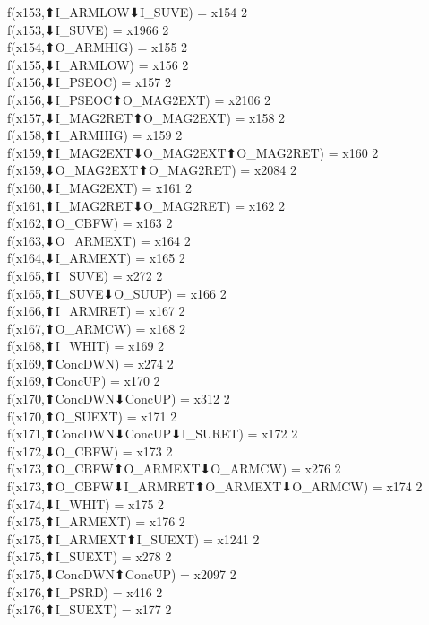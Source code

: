 f(x153,⬆I_ARMLOW⬇I_SUVE) = x154 {2} \\
f(x153,⬇I_SUVE) = x1966 {2} \\
f(x154,⬆O_ARMHIG) = x155 {2} \\
f(x155,⬇I_ARMLOW) = x156 {2} \\
f(x156,⬇I_PSEOC) = x157 {2} \\
f(x156,⬇I_PSEOC⬆O_MAG2EXT) = x2106 {2} \\
f(x157,⬇I_MAG2RET⬆O_MAG2EXT) = x158 {2} \\
f(x158,⬆I_ARMHIG) = x159 {2} \\
f(x159,⬆I_MAG2EXT⬇O_MAG2EXT⬆O_MAG2RET) = x160 {2} \\
f(x159,⬇O_MAG2EXT⬆O_MAG2RET) = x2084 {2} \\
f(x160,⬇I_MAG2EXT) = x161 {2} \\
f(x161,⬆I_MAG2RET⬇O_MAG2RET) = x162 {2} \\
f(x162,⬆O_CBFW) = x163 {2} \\
f(x163,⬇O_ARMEXT) = x164 {2} \\
f(x164,⬇I_ARMEXT) = x165 {2} \\
f(x165,⬆I_SUVE) = x272 {2} \\
f(x165,⬆I_SUVE⬇O_SUUP) = x166 {2} \\
f(x166,⬆I_ARMRET) = x167 {2} \\
f(x167,⬆O_ARMCW) = x168 {2} \\
f(x168,⬆I_WHIT) = x169 {2} \\
f(x169,⬆ConcDWN) = x274 {2} \\
f(x169,⬆ConcUP) = x170 {2} \\
f(x170,⬆ConcDWN⬇ConcUP) = x312 {2} \\
f(x170,⬆O_SUEXT) = x171 {2} \\
f(x171,⬆ConcDWN⬇ConcUP⬇I_SURET) = x172 {2} \\
f(x172,⬇O_CBFW) = x173 {2} \\
f(x173,⬆O_CBFW⬆O_ARMEXT⬇O_ARMCW) = x276 {2} \\
f(x173,⬆O_CBFW⬇I_ARMRET⬆O_ARMEXT⬇O_ARMCW) = x174 {2} \\
f(x174,⬇I_WHIT) = x175 {2} \\
f(x175,⬆I_ARMEXT) = x176 {2} \\
f(x175,⬆I_ARMEXT⬆I_SUEXT) = x1241 {2} \\
f(x175,⬆I_SUEXT) = x278 {2} \\
f(x175,⬇ConcDWN⬆ConcUP) = x2097 {2} \\
f(x176,⬆I_PSRD) = x416 {2} \\
f(x176,⬆I_SUEXT) = x177 {2} \\
